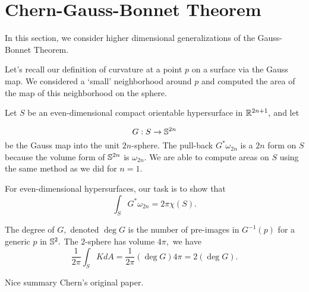 \section{Chern-Gauss-Bonnet Theorem}
\label{sec:chern-gauss-bonnet}

In this section, we consider higher dimensional generalizations of the
Gauss-Bonnet Theorem. 

Let's recall our definition of curvature at a point $p$ on a surface via the Gauss map.
We considered a `small' neighborhood around $p$ and computed
the area of the map of this neighborhood on the sphere. 

Let $S$ be an even-dimensional compact orientable hypersurface in 
$\mathbb{R}^{2n+1},$ and let

$$G:S\rightarrow \mathbb{S}^{2n}$$
be the Gauss map into the unit $2n$-sphere.
The pull-back $G^*\omega_{2n}$ is a $2n$ form on $S$ because
 the volume form  of $\mathbb{S}^{2n}$ is $\omega_{2n}.$
 We are able to compute areas on $S$ using the same method as we did 
for $n=1.$

For even-dimensional hypersurfaces, our task is to show that 
$$\int_SG^*\omega_{2n}=2\pi \chi(S).$$

The degree of $G,$ denoted $\deg G$ is the number of pre-images in 
$G^{-1}(p)$ for a generic $p$ in $\mathbb{S}^2.$
The $2$-sphere has volume $4\pi,$ we have
$$\frac{1}{2\pi}\int_SKdA=\frac{1}{2\pi}(\deg G) 4\pi = 2(\deg G).$$


\cite{li_gauss-bonnet-chern_2011} Nice summary
\cite{chern_simple_1944} Chern's original paper.